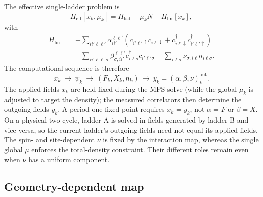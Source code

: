 \documentclass[11pt]{article}
\newcommand{\Hlad}{H_{\mathrm{lad}}}
\newcommand{\Heff}{H_{\mathrm{eff}}}
\begin{document}
The effective single-ladder problem is
\begin{equation}
  \Heff[x_k,\mu_k]=\Hlad-\mu_k N+H_{\mathrm{lin}}[x_k],
\label{eq:effective-hamiltonian}
\end{equation}
with
\begin{align}
H_{\mathrm{lin}}={}&
-\sum_{ii'\ell\ell'}\alpha_{ii'}^{\ell\ell'}
 \left(c_{i'\ell'\uparrow}c_{i\ell\downarrow}
       +c^{\dagger}_{i\ell\downarrow}c^{\dagger}_{i'\ell'\uparrow}\right)
\nonumber\\
&+\sum_{ii'\ell\ell'\sigma}\beta_{\sigma,ii'}^{\ell\ell'}
 c^{\dagger}_{i\ell\sigma}c_{i'\ell'\sigma}
 +\sum_{i\ell\sigma}\nu_{\sigma,i\ell}n_{i\ell\sigma}.
\label{eq:linear-fields}
\end{align}
The computational sequence is therefore
\begin{equation}
 x_k \ \longrightarrow\ \psi_k
 \ \longrightarrow\ (F_k,X_k,n_k)
 \ \longrightarrow\ y_k=(\alpha,\beta,\nu)^{\mathrm{out}}_k.
\end{equation}
The applied fields \(x_k\) are held fixed during the MPS solve (while the
global \(\mu_k\) is adjusted to target the density); the measured correlators
then determine the outgoing fields \(y_k\).  A period-one fixed point requires
\(x_k=y_k\), not \(\alpha=F\) or \(\beta=X\).  On a physical two-cycle,
ladder A is solved in fields generated by ladder B and vice versa, so the
current ladder's outgoing fields need not equal its applied fields.
The spin- and site-dependent \(\nu\) is fixed by the interaction map, whereas
the single global \(\mu\) enforces the total-density constraint.  Their
different roles remain even when \(\nu\) has a uniform component.

\subsection{Geometry-dependent map}
\end{document}
